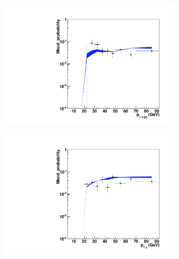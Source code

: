 \begin{figure}
        \centering
        \begin{subfigure}[b]{0.33\textwidth}
		\includegraphics[width=\textwidth]{4_Analisys/pics/8TeV/plots/fakerates/e_eet_leading_kNN_electronJetPt.pdf}
                \caption{}
        \end{subfigure}%
        \begin{subfigure}[b]{0.33\textwidth}
                \includegraphics[width=\textwidth]{4_Analisys/pics/8TeV/plots/fakerates/e_eet_leading_kNN_electronPt.pdf}
                \caption{}
        \end{subfigure}
        \begin{subfigure}[b]{0.33\textwidth}

\end{subfigure}
\end{figure}
